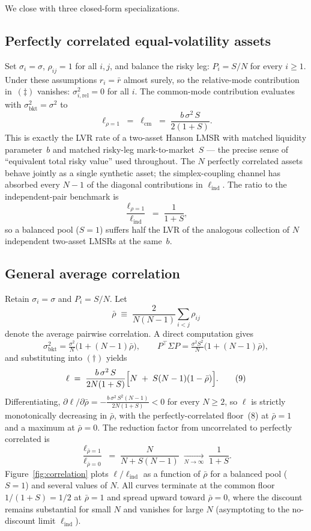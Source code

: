\documentclass[11pt]{article}
\newcommand{\bkt}{\mathrm{bkt}}
\newcommand{\rel}{\mathrm{rel}}
\newcommand{\ind}{\mathrm{ind}}
\newcommand{\cm}{\mathrm{cm}}
\newcommand{\transp}{^{\!\top}}
\begin{document}
We close with three closed-form specializations.

\subsection{Perfectly correlated equal-volatility assets}

Set $\sigma_i = \sigma$, $\rho_{ij} = 1$ for all $i, j$, and balance the risky leg: $P_i = S/N$ for every $i \ge 1$. Under these assumptions $r_i = \bar r$ almost surely, so the relative-mode contribution in~$(\ddagger)$ vanishes: $\sigma_{i,\rel}^2 = 0$ for all $i$. The common-mode contribution evaluates with $\sigma_{\bkt}^2 = \sigma^2$ to
\begin{equation*}
\ell_{\rho=1} \;=\; \ell_{\cm} \;=\; \frac{b\,\sigma^2\,S}{2(1+S)}. \tag{8}
\end{equation*}
This is exactly the LVR rate of a two-asset Hanson LMSR with matched liquidity parameter~$b$ and matched risky-leg mark-to-market~$S$ --- the precise sense of ``equivalent total risky value'' used throughout. The $N$ perfectly correlated assets behave jointly as a single synthetic asset; the simplex-coupling channel has absorbed every $N-1$ of the diagonal contributions in $\ell_{\ind}$. The ratio to the independent-pair benchmark is
\[
\frac{\ell_{\rho=1}}{\ell_{\ind}} \;=\; \frac{1}{1+S},
\]
so a balanced pool ($S = 1$) suffers half the LVR of the analogous collection of $N$ independent two-asset LMSRs at the same~$b$.

\subsection{General average correlation}

Retain $\sigma_i = \sigma$ and $P_i = S/N$. Let
\[
\bar\rho \;\equiv\; \frac{2}{N(N-1)}\sum_{i<j}\rho_{ij}
\]
denote the average pairwise correlation. A direct computation gives
\[
\sigma_{\bkt}^2 = \tfrac{\sigma^2}{N}\bigl(1 + (N-1)\bar\rho\bigr), \qquad P\transp\Sigma P = \tfrac{\sigma^2 S^2}{N}\bigl(1 + (N-1)\bar\rho\bigr),
\]
and substituting into $(\dagger)$ yields
\begin{equation*}
\ell \;=\; \frac{b\,\sigma^2\,S}{2N(1+S)}\Bigl[N \;+\; S(N-1)(1-\bar\rho)\Bigr]. \tag{9}
\end{equation*}
Differentiating, $\partial \ell / \partial \bar\rho = -\tfrac{b\,\sigma^2\,S^2(N-1)}{2N(1+S)} < 0$ for every $N \ge 2$, so $\ell$ is strictly monotonically decreasing in $\bar\rho$, with the perfectly-correlated floor~(8) at $\bar\rho = 1$ and a maximum at $\bar\rho = 0$. The reduction factor from uncorrelated to perfectly correlated is
\[
\frac{\ell_{\bar\rho=1}}{\ell_{\bar\rho=0}} \;=\; \frac{N}{N + S(N-1)} \;\xrightarrow[N\to\infty]{}\; \frac{1}{1+S}.
\]
Figure~\ref{fig:correlation} plots $\ell/\ell_{\ind}$ as a function of $\bar\rho$ for a balanced pool ($S=1$) and several values of $N$. All curves terminate at the common floor $1/(1+S) = 1/2$ at $\bar\rho = 1$ and spread upward toward $\bar\rho = 0$, where the discount remains substantial for small $N$ and vanishes for large $N$ (asymptoting to the no-discount limit $\ell_{\ind}$).
\end{document}
